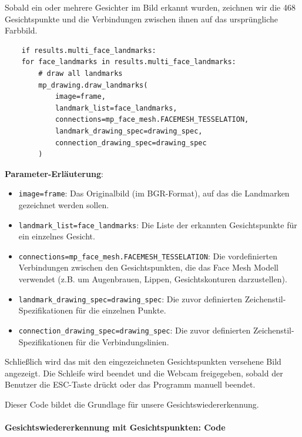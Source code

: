 Sobald ein oder mehrere Gesichter im Bild erkannt wurden, zeichnen wir die 468 Gesichtspunkte und die Verbindungen zwischen ihnen auf das ursprüngliche Farbbild.
\begin{lstlisting}
    if results.multi_face_landmarks:
    for face_landmarks in results.multi_face_landmarks:
        # draw all landmarks
        mp_drawing.draw_landmarks(
            image=frame,
            landmark_list=face_landmarks,
            connections=mp_face_mesh.FACEMESH_TESSELATION,
            landmark_drawing_spec=drawing_spec,
            connection_drawing_spec=drawing_spec
        )
\end{lstlisting}
\textbf{Parameter-Erläuterung}:
\begin{itemize}
    \item \texttt{image=frame}: Das Originalbild (im BGR-Format), auf das die Landmarken gezeichnet werden sollen.
    \item \texttt{landmark\_list=face\_landmarks}: Die Liste der erkannten Gesichtspunkte für ein einzelnes Gesicht.
    \item \texttt{connections=mp\_face\_mesh.FACEMESH\_TESSELATION}: Die vordefinierten Verbindungen zwischen den Gesichtspunkten, die das Face Mesh Modell verwendet (z.B. um Augenbrauen, Lippen, Gesichtskonturen darzustellen).
    \item \texttt{landmark\_drawing\_spec=drawing\_spec}: Die zuvor definierten Zeichenstil-Spezifikationen für die einzelnen Punkte.
    \item \texttt{connection\_drawing\_spec=drawing\_spec}: Die zuvor definierten Zeichenstil-Spezifikationen für die Verbindungslinien.
\end{itemize}

Schließlich wird das mit den eingezeichneten Gesichtspunkten versehene Bild angezeigt. Die Schleife wird beendet und die Webcam freigegeben, sobald der Benutzer die ESC-Taste drückt oder das Programm manuell beendet.

Dieser Code bildet die Grundlage für unsere Gesichtswiedererkennung.

\paragraph{Gesichtswiedererkennung mit Gesichtspunkten: Code}

